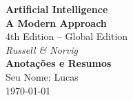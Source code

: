 \documentclass[12pt]{article}
\begin{document}
\begin{titlepage}
    \begin{center}
        {\Huge\bfseries\color{aiBlue}Artificial Intelligence}\\
        \vspace{0.4cm}
        {\Large\textbf{\color{aiGray}A Modern Approach}}\\
        {\large\color{aiBlue}4th Edition -- Global Edition}\\
        \vspace{0.2cm}
        {\color{aiGray}\textit{Russell \& Norvig}}\\
        \vspace{1cm}
        {\large\textbf{Anotações e Resumos}}\\
        \vfill
        {\large\color{aiBlue}Seu Nome: Lucas}\\
        \vspace{0.5cm}
        \today
    \end{center}
    \tableofcontents
    \thispagestyle{empty}
\end{titlepage}


\end{document}
